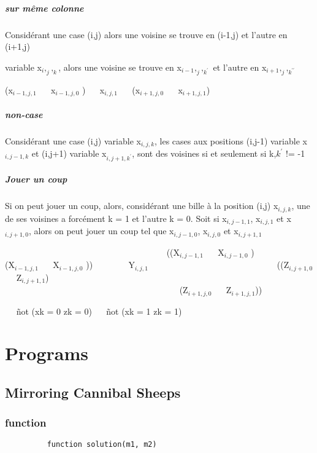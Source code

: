 \documentclass[utf8]{article}
\begin{document}
\subparagraph{sur même colonne}
Considérant une case (i,j)
alors une voisine se trouve en (i-1,j)
et l'autre en (i+1,j)

variable x$_i,_j,_k$,
alors une voisine se trouve en x$_{i-1},_j,_{k^\prime}$ et l'autre en x$_{i+1},_j,_{k^{\prime\prime}}$

(x$_{{i-1},j,1}$ \lor ~~ x$_{{i-1},j,0}$ )
\land ~~
x$_{i,j,1}$
\land ~~
(x$_{{i+1},j,0}$ \lor ~~ x$_{{i+1},j,1}$)

\subparagraph{non-case}
Considérant une case (i,j)
variable
x$_{i,j,k}$,
les cases aux positions
(i,j-1) variable x$_{i,{j-1},k}$
et (i,j+1) variable x$_{i,{j+1},{k^ {\prime} } }$,
sont des voisines
si et seulement si k,$k^ {\prime}$ != -1

\subparagraph{Jouer un coup}
Si on peut jouer un coup, alors, considérant une bille à la position (i,j) x$_{i,j,k}$, une de ses voisines
a forcément k = 1 et l'autre k = 0.\newline
Soit si x$_{i,j-1,1}$, x$_{i,j,1}$ et x$_{i,j+1,0}$, alors on peut jouer un coup tel que x$_{i,j-1,0}$, x$_{i,j,0}$ et x$_{i,j+1,1}$

\bigskip

~~~~~~~~~~~~~~~~~~~~~~~~~~~~~~~~~~~~~
((X$_{i,{j-1},1}$ \lor ~~ X$_{i,{j-1},0}$ )
\lor ~~
\\ (X$_{{i-1},j,1}$ \lor ~~ X$_{{i-1},j,0}$ ))
\land ~~~~~~~
Y$_{i,j,1}$
~~~~~~~~~~~~~~~~~~~~~~~~~~ \land ~~
((Z$_{i,{j+1},0}$ \lor ~~ Z$_{i,{j+1},1}$)
\lor
\\~~~~~~~~~~~~~~~~~~~~~~~~~~~~~~~~~~~~~~~~
(Z$_{{i+1},j,0}$ \lor ~~ Z$_{{i+1},j,1}$))

\land ~~
ñot (xk = 0 \land zk = 0)
\land ~~
ñot (xk = 1 \land zk = 1)

\newpage

\section{Programs}

\subsection{ Mirroring Cannibal Sheeps }

\subsubsection{function}

\begin{figure}[H]
\begin{minipage}{\textwidth}
  \centering	
	\begin{lstlisting}
	function solution(m1, m2) 
    \end{lstlisting}
  \label{fig:code_exemple}
\end{minipage}
\end{figure}
\end{document}
